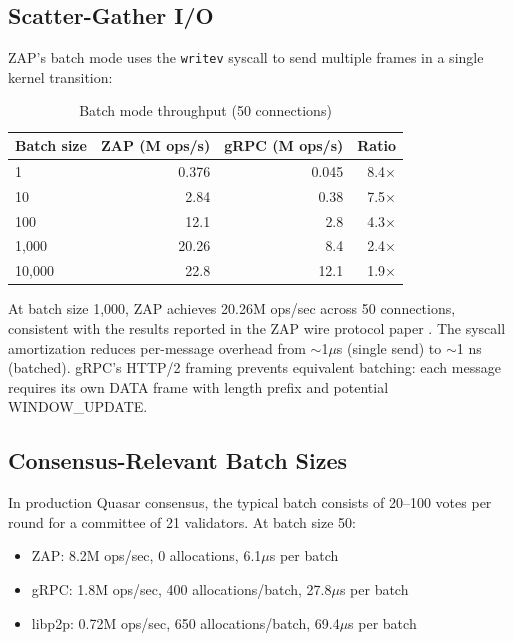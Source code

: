 \documentclass[11pt,letterpaper]{article}
\begin{document}
\subsection{Scatter-Gather I/O}

ZAP's batch mode uses the \texttt{writev} syscall to send multiple frames in a single kernel transition:

\begin{table}[h]
\centering
\caption{Batch mode throughput (50 connections)}
\label{tab:batch}
\begin{tabular}{lrrr}
\toprule
\textbf{Batch size} & \textbf{ZAP (M ops/s)} & \textbf{gRPC (M ops/s)} & \textbf{Ratio} \\
\midrule
1 & 0.376 & 0.045 & 8.4$\times$ \\
10 & 2.84 & 0.38 & 7.5$\times$ \\
100 & 12.1 & 2.8 & 4.3$\times$ \\
1,000 & 20.26 & 8.4 & 2.4$\times$ \\
10,000 & 22.8 & 12.1 & 1.9$\times$ \\
\bottomrule
\end{tabular}
\end{table}

At batch size 1,000, ZAP achieves 20.26M ops/sec across 50 connections, consistent with the results reported in the ZAP wire protocol paper \cite{zapwire}. The syscall amortization reduces per-message overhead from $\sim$1$\mu$s (single send) to $\sim$1 ns (batched). gRPC's HTTP/2 framing prevents equivalent batching: each message requires its own DATA frame with length prefix and potential WINDOW\_UPDATE.

\subsection{Consensus-Relevant Batch Sizes}

In production Quasar consensus, the typical batch consists of 20--100 votes per round for a committee of 21 validators. At batch size 50:

\begin{itemize}
\item ZAP: 8.2M ops/sec, 0 allocations, 6.1$\mu$s per batch
\item gRPC: 1.8M ops/sec, 400 allocations/batch, 27.8$\mu$s per batch
\item libp2p: 0.72M ops/sec, 650 allocations/batch, 69.4$\mu$s per batch
\end{itemize}
\end{document}
